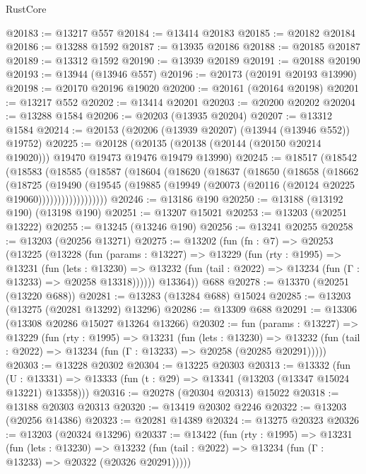 \begin{lexlean}{RustCore}
\begin{coremodule}
@20183 := @13217 @557
@20184 := @13414 @20183
@20185 := @20182 @20184
@20186 := @13288 @1592
@20187 := @13935 @20186
@20188 := @20185 @20187
@20189 := @13312 @1592
@20190 := @13939 @20189
@20191 := @20188 @20190
@20193 := @13944 (@13946 @557)
@20196 := @20173 (@20191 @20193 @13990)
@20198 := @20170 @20196 @19020
@20200 := @20161 (@20164 @20198)
@20201 := @13217 @552
@20202 := @13414 @20201
@20203 := @20200 @20202
@20204 := @13288 @1584
@20206 := @20203 (@13935 @20204)
@20207 := @13312 @1584
@20214 := @20153 (@20206 (@13939 @20207) (@13944 (@13946 @552)) @19752)
@20225 := @20128
    (@20135 (@20138 (@20144 (@20150 @20214 @19020))) @19470 @19473 @19476 @19479 @13990)
@20245 := @18517
    (@18542
      (@18583
        (@18585
          (@18587
            (@18604
              (@18620
                (@18637
                  (@18650
                    (@18658
                      (@18662
                        (@18725
                          (@19490
                            (@19545
                              (@19885
                                (@19949 (@20073 (@20116 (@20124 @20225 @19060))))))))))))))))))
@20246 := @13186 @190
@20250 := @13188 (@13192 @190) (@13198 @190)
@20251 := @13207 @15021
@20253 := @13203 (@20251 @13222)
@20255 := @13245 (@13246 @190)
@20256 := @13241 @20255
@20258 := @13203 (@20256 @13271)
@20275 := @13202
    (fun (fn : @7) =>
    @20253
      (@13225
        (@13228
          (fun (params : @13227) =>
          @13229
            (fun (rty : @1995) =>
            @13231
              (fun (lets : @13230) =>
              @13232 (fun (tail : @2022) => @13234 (fun (Γ : @13233) => @20258 @13318))))))
        @13364))
    @688
@20278 := @13370 (@20251 (@13220 @688))
@20281 := @13283 (@13284 @688) @15024
@20285 := @13203 (@13275 (@20281 @13292) @13296)
@20286 := @13309 @688
@20291 := @13306 (@13308 @20286 @15027 @13264 @13266)
@20302 := fun (params : @13227) =>
  @13229
    (fun (rty : @1995) =>
    @13231
      (fun (lets : @13230) =>
      @13232 (fun (tail : @2022) => @13234 (fun (Γ : @13233) => @20258 (@20285 @20291)))))
@20303 := @13228 @20302
@20304 := @13225 @20303
@20313 := @13332
    (fun (U : @13331) => @13333 (fun (t : @29) => @13341 (@13203 (@13347 @15024 @13221) @13358)))
@20316 := @20278 (@20304 @20313) @15022
@20318 := @13188 @20303 @20313
@20320 := @13419 @20302 @2246
@20322 := @13203 (@20256 @14386)
@20323 := @20281 @14389
@20324 := @13275 @20323
@20326 := @13203 (@20324 @13296)
@20337 := @13422
    (fun (rty : @1995) =>
    @13231
      (fun (lets : @13230) =>
      @13232 (fun (tail : @2022) => @13234 (fun (Γ : @13233) => @20322 (@20326 @20291)))))

\end{coremodule}
\end{lexlean}
